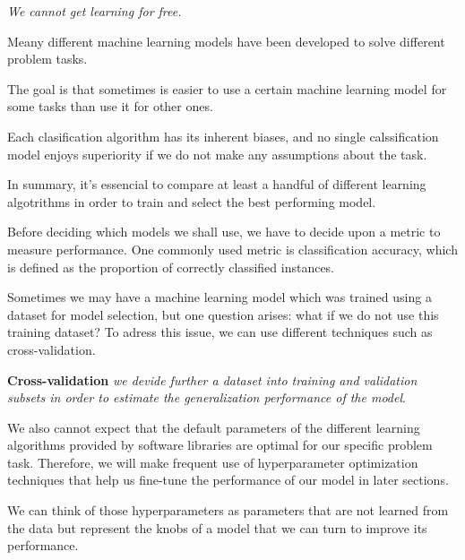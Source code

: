 \documentclass[../machine_learning_scikit.tex]{subfiles}
\begin{document}
    \begin{center}
        \textit{We cannot get learning for free.}
    \end{center}

    \begin{obs}
        Meany different machine learning models have been developed to solve different problem tasks.
    \end{obs}

    The goal is that sometimes is easier to use a certain machine learning model for some tasks than use it for other ones.

    \begin{exa}
        Each clasification algorithm has its inherent biases, and no single calssification model enjoys superiority if we do not make any assumptions about the task.
    \end{exa}

    In summary, it's essencial to compare at least a handful of different learning algotrithms in order to train and select the best performing model.

    \begin{obs}
        Before deciding which models we shall use, we have to decide upon a metric to measure performance. One commonly used metric is classification accuracy, which is defined as the proportion of correctly classified instances.
    \end{obs}

    Sometimes we may have a machine learning model which was trained using a dataset for model selection, but one question arises: what if we do not use this training dataset? To adress this issue, we can use different techniques such as cross-validation.

    \begin{mydef}
        \textbf{Cross-validation} \textit{we devide further a dataset into training and validation subsets in order to estimate the generalization performance of the model}.
    \end{mydef}

    \begin{obs}
        We also cannot expect that the default parameters of the different learning algorithms provided by software libraries are optimal for our specific problem task. Therefore, we will make frequent use of hyperparameter optimization techniques that help us fine-tune the performance of our model in later sections.

        We can think of those hyperparameters as parameters that are not learned from the data but represent the knobs of a model that we can turn to improve its performance.
    \end{obs}
\end{document}
